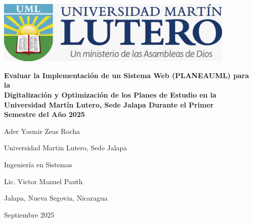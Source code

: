 \begin{titlepage}
     \par
    \vspace{0.5in}
    \centering
    \singlespacing

    \includegraphics[height=1.2in,keepaspectratio]{figuras/logo.jpeg}
    \vspace{0.5in}

    \textbf{Evaluar la Implementación de un Sistema Web (PLANEAUML) para la \\ Digitalización y Optimización de los Planes de Estudio en la \\ Universidad Martín Lutero, Sede Jalapa Durante el Primer \\ Semestre del Año 2025} \par

    \vspace{1.5in}

    Ader Yasmir Zeas Rocha \par

    \vspace{0.5\baselineskip}

    Universidad Martin Lutero, Sede Jalapa \par

    \vspace{0.5\baselineskip}

    Ingeniería en Sistemas \par

    \vspace{0.5\baselineskip}

    Lic. Victor Manuel Pauth \par

    \vspace{0.5\baselineskip}

    Jalapa, Nueva Segovia, Nicaragua \par

    \vspace{0.5\baselineskip}

    Septiembre 2025 \par

\end{titlepage}